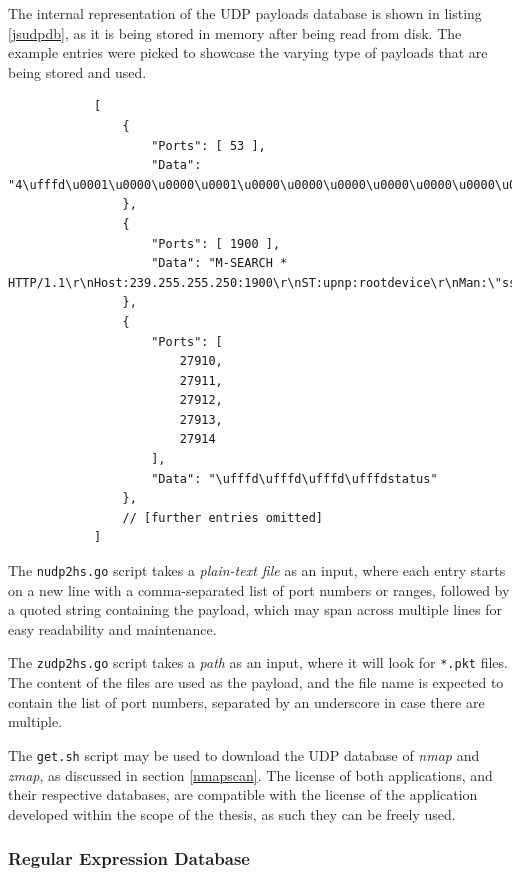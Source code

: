 \documentclass[a4paper,12pt]{article}
\begin{document}
	The internal representation of the UDP payloads database is shown in listing \ref{jsudpdb}, as it is being stored in memory after being read from disk. The example entries were picked to showcase the varying type of payloads that are being stored and used.
	
	\begin{listing}[H]
		\begin{verbatim}
			[
				{
					"Ports": [ 53 ],
					"Data": "4\ufffd\u0001\u0000\u0000\u0001\u0000\u0000\u0000\u0000\u0000\u0000\u0007VERSION\u0004BIND\u0000\u0000\u0010\u0000\u0003"
				},
				{
					"Ports": [ 1900 ],
					"Data": "M-SEARCH * HTTP/1.1\r\nHost:239.255.255.250:1900\r\nST:upnp:rootdevice\r\nMan:\"ssdp:discover\"\r\nMX:3\r\n\r\n\r\n"
				},
				{
					"Ports": [
						27910,
						27911,
						27912,
						27913,
						27914
					],
					"Data": "\ufffd\ufffd\ufffd\ufffdstatus"
				},
				// [further entries omitted]
			]
		\end{verbatim}
		\caption{Approximate internal representation of the UDP payload database}
		\label{jsudpdb}
	\end{listing}
	
	The \texttt{nudp2hs.go} script takes a \textit{plain-text file} as an input, where each entry starts on a new line with a comma-separated list of port numbers or ranges, followed by a quoted string containing the payload, which may span across multiple lines for easy readability and maintenance.
	
	The \texttt{zudp2hs.go} script takes a \textit{path} as an input, where it will look for \texttt{*.pkt} files. The content of the files are used as the payload, and the file name is expected to contain the list of port numbers, separated by an underscore in case there are multiple.
	
	The \texttt{get.sh} script may be used to download the UDP database of \textit{nmap} and \textit{zmap}, as discussed in section \ref{nmapscan}. The license of both applications, and their respective databases, are compatible with the license of the application developed within the scope of the thesis, as such they can be freely used.

\subsubsection{Regular Expression Database} \label{datregex}
 
\end{document}
